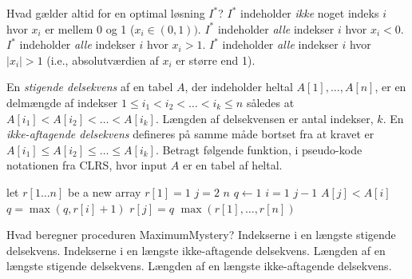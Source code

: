 \maxproductproblem

\medskip

\noindent
Hvad gælder altid for en optimal løsning $I^*$?
\fleresvar
\mulighederstart
\svar $I^*$ indeholder \emph{ikke} noget indeks $i$ hvor $x_i$ er mellem 0 og 1 ($x_i\in (0,1))$. \korrekt
\svar $I^*$ indeholder \emph{alle} indekser $i$ hvor $x_i < 0$.
\svar $I^*$ indeholder \emph{alle} indekser $i$ hvor $x_i > 1$. \korrekt
\svar $I^*$ indeholder \emph{alle} indekser $i$ hvor $|x_i| > 1$ (i.e., absolutværdien af $x_i$ er større end 1).
\mulighederslut
{}



En \emph{stigende delsekvens} af en tabel $A$, der indeholder heltal $A[1],\dots,A[n]$, er en delmængde af indekser $1\leq i_1 < i_2 < \dots < i_k \leq n$ således at $A[i_1] < A[i_2] < \dots < A[i_k]$.
Længden af delsekvensen er antal indekser, $k$.
En \emph{ikke-aftagende delsekvens} defineres på samme måde bortset fra at kravet er $A[i_1] \leq A[i_2] \leq \dots \leq A[i_k]$.
Betragt følgende funktion, i pseudo-kode notationen fra CLRS, hvor input $A$ er en tabel af heltal.
\begin{codebox}
  \li let $r[1\dots n]$ be a new array
  \li $r[1] = 1$
  \li \For $j = 2$ \To $n$
  \li \Do $q \gets 1$
  \li \For $i=1$ \To $j-1$
  \li \Do {} $A[j] < A[i]$
  \li \Then $q = \max(q, r[i] + 1)$ \End\End
  \li $r[j]=q$ \End
  \li \Return $\max(r[1],\dots,r[n])$
\end{codebox}

\noindent
Hvad beregner proceduren {\sc MaximumMystery}?
\etsvar
\mulighederstart
\svar Indekserne i en længste stigende delsekvens.
\svar Indekserne i en længste ikke-aftagende delsekvens.
\svar Længden af en længste stigende delsekvens.
\svar Længden af en længste ikke-aftagende delsekvens. \korrekt
\mulighederslut

